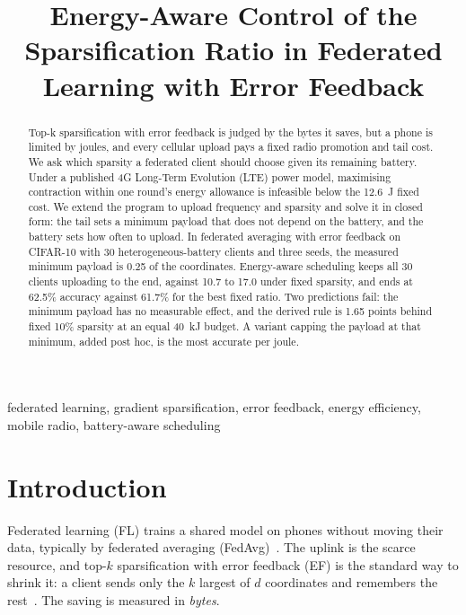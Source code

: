 \documentclass[conference,a4paper]{IEEEtran}
\begin{document}
\title{Energy-Aware Control of the Sparsification Ratio in Federated Learning with Error Feedback}

\author{
}

\maketitle

\begin{abstract}
Top-k sparsification with error feedback is judged by the bytes it saves, but a phone is limited by joules, and every cellular upload pays a fixed radio promotion and tail cost. We ask which sparsity a federated client should choose given its remaining battery. Under a published 4G Long-Term Evolution (LTE) power model, maximising contraction within one round's energy allowance is infeasible below the 12.6~J fixed cost. We extend the program to upload frequency and sparsity and solve it in closed form: the tail sets a minimum payload that does not depend on the battery, and the battery sets how often to upload. In federated averaging with error feedback on CIFAR-10 with 30 heterogeneous-battery clients and three seeds, the measured minimum payload is 0.25 of the coordinates. Energy-aware scheduling keeps all 30 clients uploading to the end, against 10.7 to 17.0 under fixed sparsity, and ends at 62.5\% accuracy against 61.7\% for the best fixed ratio. Two predictions fail: the minimum payload has no measurable effect, and the derived rule is 1.65 points behind fixed 10\% sparsity at an equal 40~kJ budget. A variant capping the payload at that minimum, added post hoc, is the most accurate per joule.
\end{abstract}

\begin{IEEEkeywords}
federated learning, gradient sparsification, error feedback, energy efficiency, mobile radio, battery-aware scheduling
\end{IEEEkeywords}

\section{Introduction}
Federated learning (FL) trains a shared model on phones without moving their data, typically by federated averaging (FedAvg)~\cite{mcmahan2017}. The uplink is the scarce resource, and top-$k$ sparsification with error feedback (EF) is the standard way to shrink it: a client sends only the $k$ largest of $d$ coordinates and remembers the rest~\cite{aji2017,stich2018,karimireddy2019}. The saving is measured in \emph{bytes}.
\end{document}

